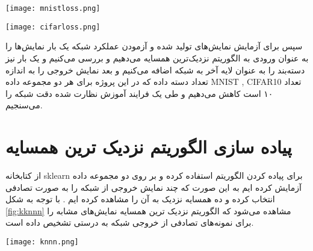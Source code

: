 % 
 
\begin{minipage}{0.49\linewidth}
	\centering
	\texttt{[image: mnistloss.png]}
	\captionsetup{font=small} %
	\label{fig:loss1}
\end{minipage}
\begin{minipage}{0.49\linewidth}
	\centering
	\texttt{[image: cifarloss.png]}
	\captionsetup{font=small} %
	\label{fig:loss2}

\end{minipage}




سپس برای آزمایش نمایش‌های تولید شده و آزمودن عملکرد شبکه یک بار نمایش‌ها را به عنوان ورودی به الگوریتم نزدیک‌ترین همسایه می‌دهیم و بررسی می‌کنیم و یک بار نیز  دسته‌بند را به عنوان لایه آخر به شبکه اضافه می‌کنیم و بعد نمایش خروجی را به اندازه تعداد دسته داده که در این پروژه برای هر دو مجموعه داده MNIST , CIFAR10 تعداد ۱۰ است کاهش می‌دهیم و طی یک فرایند آموزش نظارت شده دقت شبکه را می‌سنجیم.


\section{پیاده سازی الگوریتم نزدیک ترین همسایه }
از کتابخانه sklearn برای پیاده کردن الگوریتم استفاده کرده و بر روی دو مجموعه داده آزمایش کرده ایم به این صورت که چند نمایش خروجی از شبکه را به صورت تصادفی انتخاب کرده و ده همسایه نزدیک به آن را مشاهده کرده ایم . با توجه به شکل  \ref{fig:kknnn} مشاهده می‌شود که الگوریتم نزدیک ترین همسایه نمایش‌های مشابه را برای نمونه‌های تصادفی از خروجی شبکه به درستی تشخیص داده است.


\begin{minipage}{\linewidth}
	\centering
	\texttt{[image: knnn.png]}
	\captionsetup{font=small} %
	\label{fig:kknnn}
\end{minipage}



